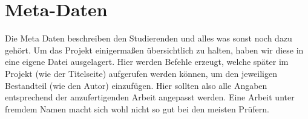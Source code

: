 
\chapter{Meta-Daten}

Die Meta Daten beschreiben den Studierenden und alles was sonst noch dazu gehört. 
Um das Projekt einigermaßen übersichtlich zu halten, haben wir diese in eine eigene Datei ausgelagert. 
Hier werden Befehle erzeugt, welche später im Projekt (wie der Titelseite) aufgerufen werden können, um den jeweiligen Bestandteil (wie den Autor) einzufügen. 
Hier sollten also alle Angaben entsprechend der anzufertigenden Arbeit angepasst werden. 
Eine Arbeit unter fremdem Namen macht sich wohl nicht so gut bei den meisten Prüfern.